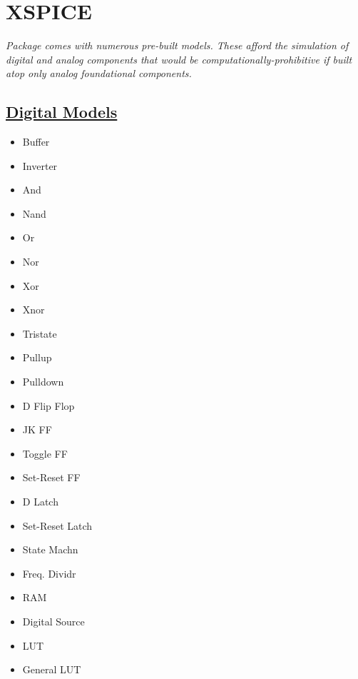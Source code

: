 \section{XSPICE}
\textit{Package comes with numerous pre-built models. These afford the simulation of digital and analog components that would be computationally-prohibitive if built atop only analog foundational components.}

\subsection*{\href{https://sourceforge.net/p/ngspice/ngspice/ci/master/tree/src/xspice/icm/digital/}{Digital Models}}
{\footnotesize
\begin{multicols}{3}\noindent\begin{itemize}[label={},leftmargin=0pt,topsep=0pt]
    \item Buffer
    \item Inverter
    \item And
    \item Nand
    \item Or
    \item Nor
    \item Xor
    \item Xnor
    \item Tristate
    \item Pullup
    \item Pulldown
    \item D Flip Flop
    \item JK FF
    \item Toggle FF
    \item Set-Reset FF
    \item D Latch
    \item Set-Reset Latch
    \item State Mach\textquotesingle n
    \item Freq. Divid\textquotesingle r
    \item RAM
    \item Digital Source
    \item LUT
    \item General LUT
\end{itemize}\end{multicols}
}



